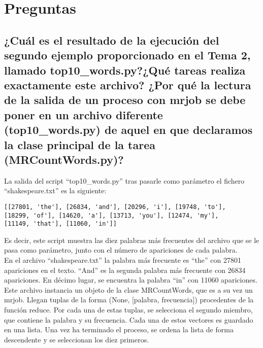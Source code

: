 \documentclass[12pt,a4paper,twoside,openright,titlepage,final]{article}
\author{José Ignacio Escribano}
\title{}
\begin{document}
\setcounter{page}{1}


\tableofcontents
\thispagestyle{empty}
\newpage

\setcounter{page}{1}


\section{Preguntas}

\subsection{¿Cuál es el resultado de la ejecución del segundo ejemplo proporcionado en el Tema 2, llamado top10\_words.py?¿Qué tareas realiza exactamente este archivo? ¿Por qué la lectura de la salida de un proceso con mrjob se debe poner en un archivo diferente (top10\_words.py) de aquel en que declaramos la clase principal de la tarea (MRCountWords.py)?}

La salida del script ``top10\_words.py'' tras pasarle como parámetro el fichero ``shakespeare.txt'' es la siguiente:

\begin{verbatim}
[[27801, 'the'], [26834, 'and'], [20296, 'i'], [19748, 'to'], 
[18299, 'of'], [14620, 'a'], [13713, 'you'], [12474, 'my'], 
[11149, 'that'], [11060, 'in']]
\end{verbatim}

Es decir, este script muestra las diez palabras más frecuentes del archivo que se le pasa como parámetro, junto con el número de apariciones de cada palabra.\\

En el archivo ``shakespeare.txt'' la palabra más frecuente es ``the'' con 27801 apariciones en el texto. ``And'' es la segunda palabra más frecuente con 26834 apariciones. En décimo lugar, se encuentra la palabra ``in'' con 11060 apariciones.\\

Este archivo instancia un objeto de la clase MRCountWords, que es a su vez un mrjob. Llegan tuplas de la forma (None, [palabra, frecuencia]) procedentes de la función reduce. Por cada una de estas tuplas, se selecciona el segundo miembro, que contiene la palabra y su frecuencia. Cada una de estos vectores es guardado en una lista. Una vez ha terminado el proceso, se ordena la lista de forma descendente y se seleccionan los diez primeros.\\
\end{document}
